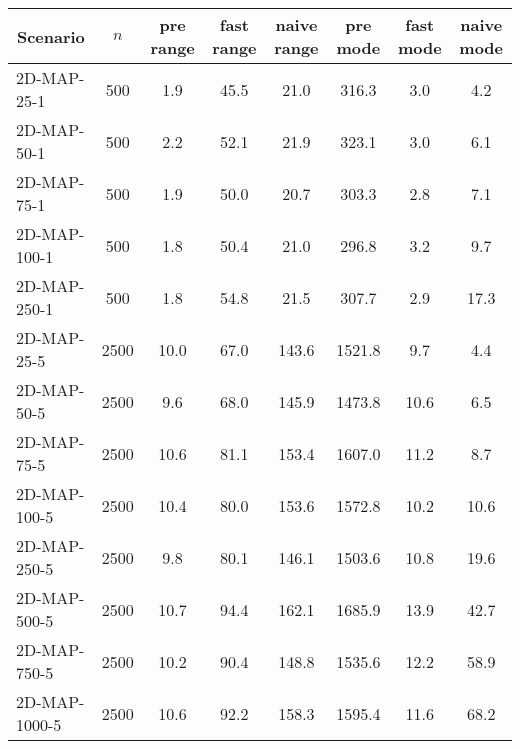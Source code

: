 \documentclass{article}
\begin{document}
    \begin{table}[h]
        \begin{center}
        \begin{tabular}{|l||c|c|c|c|c|c|c|}
            \hline
            \multicolumn{1}{|c|}{Scenario} & $n$   & pre range & fast range & naive range & pre mode & fast mode & naive mode \\
            \hline
            \hline
            2D-MAP-25-1                    & 500   & 1.9       & 45.5       & 21.0        & 316.3    & 3.0       & 4.2        \\
            2D-MAP-50-1                    & 500   & 2.2       & 52.1       & 21.9        & 323.1    & 3.0       & 6.1        \\
            2D-MAP-75-1                    & 500   & 1.9       & 50.0       & 20.7        & 303.3    & 2.8       & 7.1        \\
            2D-MAP-100-1                   & 500   & 1.8       & 50.4       & 21.0        & 296.8    & 3.2       & 9.7        \\
            2D-MAP-250-1                   & 500   & 1.8       & 54.8       & 21.5        & 307.7    & 2.9       & 17.3       \\
            \hline
            2D-MAP-25-5                    & 2500  & 10.0      & 67.0       & 143.6       & 1521.8   & 9.7       & 4.4        \\
            2D-MAP-50-5                    & 2500  & 9.6       & 68.0       & 145.9       & 1473.8   & 10.6      & 6.5        \\
            2D-MAP-75-5                    & 2500  & 10.6      & 81.1       & 153.4       & 1607.0   & 11.2      & 8.7        \\
            2D-MAP-100-5                   & 2500  & 10.4      & 80.0       & 153.6       & 1572.8   & 10.2      & 10.6       \\
            2D-MAP-250-5                   & 2500  & 9.8       & 80.1       & 146.1       & 1503.6   & 10.8      & 19.6       \\
            2D-MAP-500-5                   & 2500  & 10.7      & 94.4       & 162.1       & 1685.9   & 13.9      & 42.7       \\
            2D-MAP-750-5                   & 2500  & 10.2      & 90.4       & 148.8       & 1535.6   & 12.2      & 58.9       \\
            2D-MAP-1000-5                  & 2500  & 10.6      & 92.2       & 158.3       & 1595.4   & 11.6      & 68.2       \\

\end{tabular}
\end{center}
\end{table}
\end{document}
